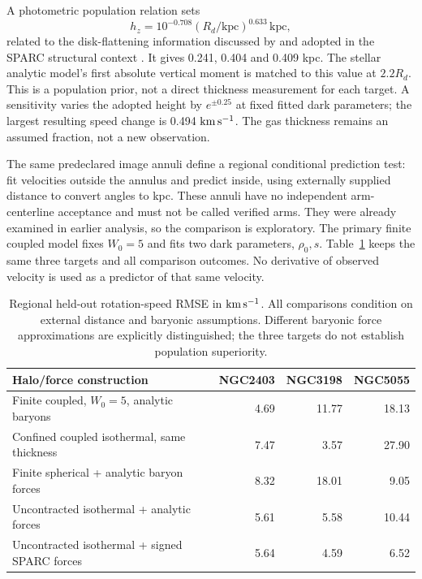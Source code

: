 \documentclass[10pt]{article}
\begin{document}
A photometric population relation sets
\begin{equation}
 h_z=10^{-0.708}(R_d/\mathrm{kpc})^{0.633}\,\mathrm{kpc},
\end{equation}
related to the disk-flattening information discussed by
\citet{bershady2010} and adopted in the SPARC structural context
\citep{lelli2016}. It gives 0.241, 0.404 and 0.409 kpc. The stellar analytic
model's first absolute vertical moment is matched to this value at $2.2R_d$.
This is a population prior, not a direct thickness measurement for each target.
A sensitivity varies the adopted height by $e^{\pm0.25}$ at fixed fitted dark
parameters; the largest resulting speed change is 0.494 $\mathrm{km\,s^{-1}}$. The gas
thickness remains an assumed fraction, not a new observation.

The same predeclared image annuli define a regional conditional prediction
test: fit velocities outside the annulus and predict inside, using externally
supplied distance to convert angles to kpc. These annuli have no independent
arm-centerline acceptance and must not be called verified arms. They were
already examined in earlier analysis, so the comparison is exploratory.
The primary finite coupled model fixes $W_0=5$ and fits two dark parameters,
$\rho_0,s$. Table~\ref{tab:fluid} keeps the same three targets and all comparison
outcomes. No derivative of observed velocity is used as a predictor of that
same velocity.

\begin{table}[htb]
\centering\small
\caption{Regional held-out rotation-speed RMSE in $\mathrm{km\,s^{-1}}$. All comparisons
condition on external distance and baryonic assumptions. Different baryonic
force approximations are explicitly distinguished; the three targets do not
establish population superiority.}
\label{tab:fluid}
\begin{tabular}{lrrr}
\toprule
Halo/force construction & NGC2403 & NGC3198 & NGC5055\\
\midrule
Finite coupled, $W_0=5$, analytic baryons & 4.69 & 11.77 & 18.13\\
Confined coupled isothermal, same thickness & 7.47 & 3.57 & 27.90\\
Finite spherical + analytic baryon forces & 8.32 & 18.01 & 9.05\\
Uncontracted isothermal + analytic forces & 5.61 & 5.58 & 10.44\\
Uncontracted isothermal + signed SPARC forces & 5.64 & 4.59 & 6.52\\
\bottomrule
\end{tabular}
\end{table}
\end{document}
